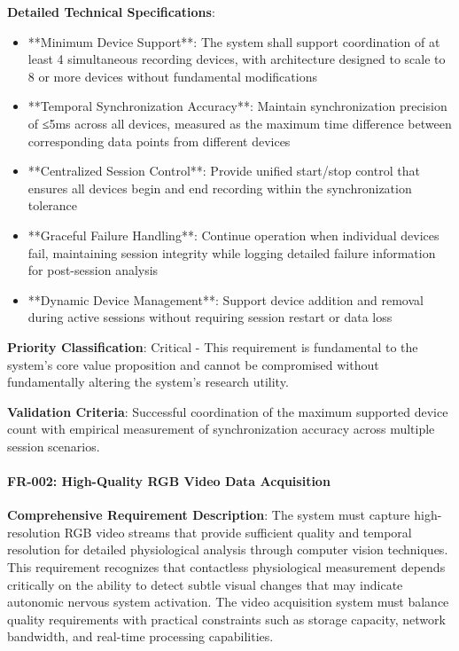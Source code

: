 \documentclass[12pt,a4paper]{report}
\begin{document}
\textbf{Detailed Technical Specifications}:

\begin{itemize}
\item **Minimum Device Support**: The system shall support coordination of at least 4 simultaneous recording devices, with
  architecture designed to scale to 8 or more devices without fundamental modifications
\item **Temporal Synchronization Accuracy**: Maintain synchronization precision of ≤5ms across all devices, measured as the
  maximum time difference between corresponding data points from different devices
\item **Centralized Session Control**: Provide unified start/stop control that ensures all devices begin and end recording
  within the synchronization tolerance
\item **Graceful Failure Handling**: Continue operation when individual devices fail, maintaining session integrity while
  logging detailed failure information for post-session analysis
\item **Dynamic Device Management**: Support device addition and removal during active sessions without requiring session
  restart or data loss

\end{itemize}
\textbf{Priority Classification}: Critical - This requirement is fundamental to the system's core value proposition and
cannot be compromised without fundamentally altering the system's research utility.

\textbf{Validation Criteria}: Successful coordination of the maximum supported device count with empirical measurement of
synchronization accuracy across multiple session scenarios.

\paragraph{FR-002: High-Quality RGB Video Data Acquisition}

\textbf{Comprehensive Requirement Description}: The system must capture high-resolution RGB video streams that provide
sufficient quality and temporal resolution for detailed physiological analysis through computer vision techniques. This
requirement recognizes that contactless physiological measurement depends critically on the ability to detect subtle
visual changes that may indicate autonomic nervous system activation. The video acquisition system must balance quality
requirements with practical constraints such as storage capacity, network bandwidth, and real-time processing
capabilities.
\end{document}
